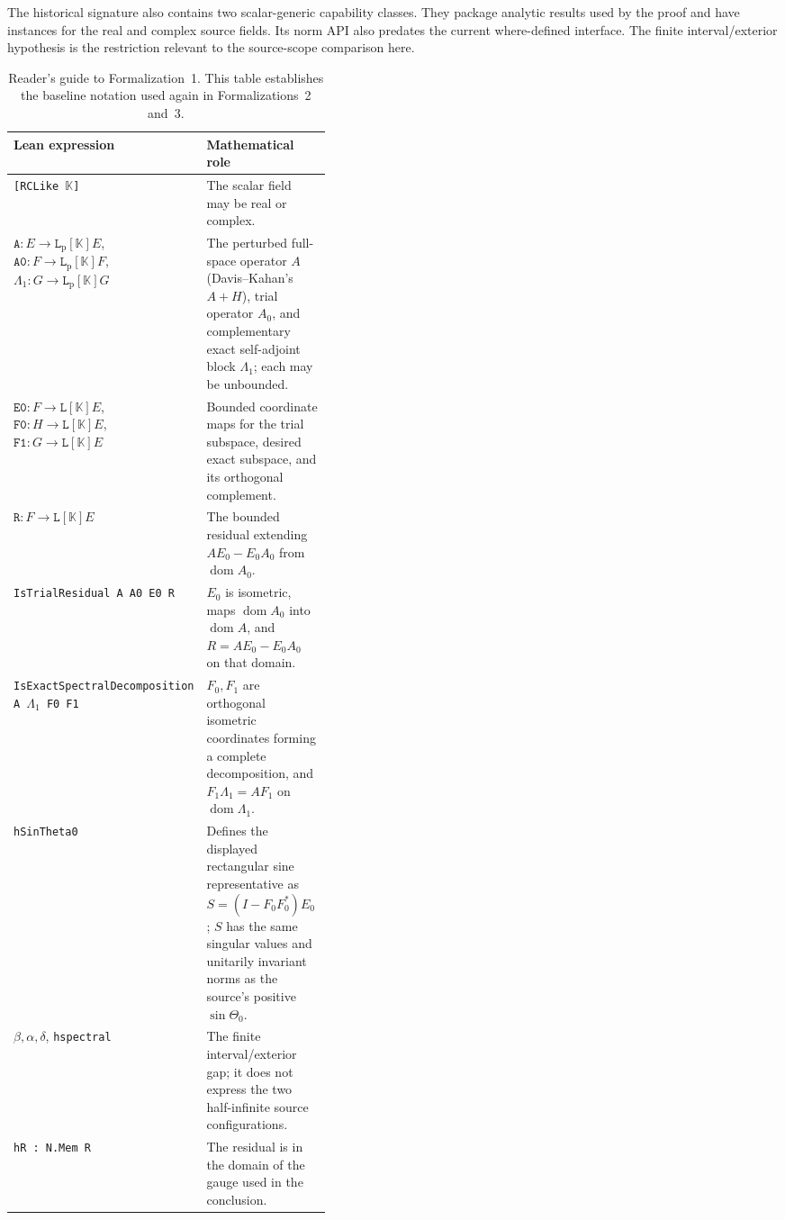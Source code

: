 The historical signature also contains two scalar-generic capability classes.
They package analytic results used by the proof and have instances for the real
and complex source fields.  Its norm API also predates the current where-defined
interface.  The finite interval/exterior hypothesis is the restriction relevant
to the source-scope comparison here.

\begin{table}[H]
\centering
\small
\caption{Reader's guide to Formalization~1.  This table establishes the
baseline notation used again in Formalizations~2 and~3.}
\label{tab:formalization1-glossary}
\begin{tabularx}{\linewidth}{@{}>{\raggedright\arraybackslash}p{0.41\linewidth}>{\raggedright\arraybackslash}X@{}}
\toprule
Lean expression & Mathematical role \\
\midrule
\texttt{[RCLike }$\mathbb K$\texttt{]}
  & The scalar field may be real or complex. \\
$\texttt{A}:E\mathrel{\to}\!\mathtt{L}_{\mathrm p}[\mathbb K]E$,
$\texttt{A0}:F\mathrel{\to}\!\mathtt{L}_{\mathrm p}[\mathbb K]F$,
$\Lambda_1:G\mathrel{\to}\!\mathtt{L}_{\mathrm p}[\mathbb K]G$
  & The perturbed full-space operator $A$ (Davis--Kahan's $A+H$), trial
    operator $A_0$, and complementary exact self-adjoint block $\Lambda_1$;
    each may be unbounded. \\
$\texttt{E0}:F\mathrel{\to}\!\mathtt{L}[\mathbb K]E$,
$\texttt{F0}:H\mathrel{\to}\!\mathtt{L}[\mathbb K]E$,
$\texttt{F1}:G\mathrel{\to}\!\mathtt{L}[\mathbb K]E$
  & Bounded coordinate maps for the trial subspace, desired exact subspace,
    and its orthogonal complement. \\
$\texttt{R}:F\mathrel{\to}\!\mathtt{L}[\mathbb K]E$
  & The bounded residual extending $AE_0-E_0A_0$ from $\operatorname{dom}A_0$. \\
\texttt{IsTrialResidual A A0 E0 R}
  & $E_0$ is isometric, maps $\operatorname{dom}A_0$ into
    $\operatorname{dom}A$, and $R=AE_0-E_0A_0$ on that domain. \\
\texttt{IsExactSpectralDecomposition A }$\Lambda_1$\texttt{ F0 F1}
  & $F_0,F_1$ are orthogonal isometric coordinates forming a complete
    decomposition, and $F_1\Lambda_1=AF_1$ on $\operatorname{dom}\Lambda_1$. \\
\texttt{hSinTheta0}
  & Defines the displayed rectangular sine representative as
    $S=(I-F_0F_0^*)E_0$; $S$ has the same singular values and unitarily
    invariant norms as the source's positive $\sin\Theta_0$. \\
$\beta,\alpha,\delta$, \texttt{hspectral}
  & The finite interval/exterior gap; it does not express the two
    half-infinite source configurations. \\
\texttt{hR : N.Mem R}
  & The residual is in the domain of the gauge used in the conclusion. \\
\bottomrule
\end{tabularx}
\end{table}

